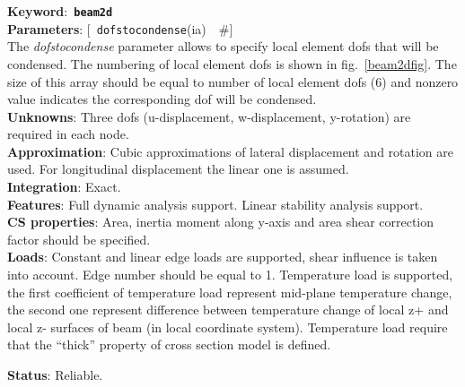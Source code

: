 \documentclass[a4paper]{article}
\newcommand{\descitem}[1]{{\noindent \bf #1}:}
\newcommand{\elemkeyword}[1]{\descitem{Keyword}~{\bf \texttt{#1}}}
\newcommand{\elemparam}[2]{{{\texttt{#1}\tiny (#2)}~~\#}}
\newcommand{\optelemparam}[2]{{[~\elemparam{#1}{#2}]}}
\newcommand{\param}[1]{{\em #1}}
\begin{document}
\elemkeyword{beam2d}\\
\descitem{Parameters} \optelemparam{dofstocondense}{ia}\\
The \param{dofstocondense} parameter allows to specify local element dofs that
will be condensed. The numbering of local element dofs is shown in
fig.~\ref{beam2dfig}. The size of this array should be equal to
number of local element dofs (6) and nonzero value indicates the
corresponding dof will be condensed.\\
\descitem{Unknowns}
Three dofs (u-displacement, w-displacement, y-rotation) are required
in each node.\\
\descitem{Approximation} Cubic  approximations of lateral displacement and
rotation are used. For longitudinal displacement the linear one is
assumed.\\
\descitem{Integration} Exact.\\
\descitem{Features} Full dynamic analysis support. Linear stability
analysis support.\\
\descitem{CS properties} Area,
inertia moment along y-axis and area shear correction factor should be specified.\\ 
\descitem{Loads}  Constant and linear edge loads are supported, shear
influence is taken into account. 
Edge number should be equal to 1. Temperature load is
supported, the first coefficient of temperature load represent
mid-plane temperature change, the second one represent difference
between temperature change of local z+ and local z- surfaces of beam (in local coordinate
system). Temperature load require that the ``thick'' property of cross
section model is defined.

\descitem{Status} Reliable.
\end{document}
